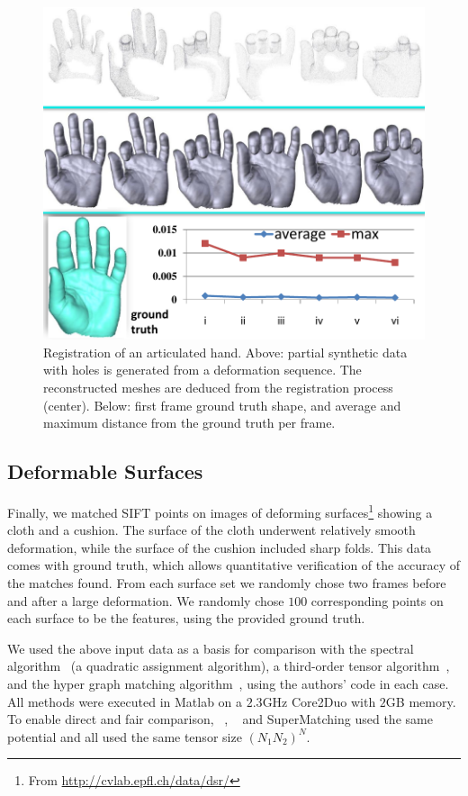 \begin{figure}[h]
\centering
  \includegraphics[width=0.95\linewidth]{figures/3DHand.pdf}
  \caption{Registration of an articulated hand.
  Above: partial synthetic data with holes is generated from a deformation sequence.
  The reconstructed meshes are deduced from the registration process (center).
  Below: first frame ground truth shape, and average and maximum distance from the ground truth per frame.}
\label{fig:3DHand}
\end{figure}

\subsection{Deformable Surfaces}
\label{subsec:2DDeformable}

Finally, we matched SIFT points on images of deforming surfaces\footnote{From \url{http://cvlab.epfl.ch/data/dsr/}} showing a cloth and a cushion.
The surface of the cloth underwent relatively smooth deformation, while the surface of the cushion included sharp folds.
This data comes with ground truth, which allows quantitative verification of the accuracy of the matches found.
From each surface set we randomly chose two frames before and after a large deformation.
We randomly chose $100$ corresponding points on each surface to be the features, using the provided ground truth.

We used the above input data as a basis for comparison with the spectral algorithm~\cite{Cour06} (a quadratic assignment algorithm),
a third-order tensor algorithm~\cite{Duchenne09},
and the hyper graph matching algorithm~\cite{Zass08}, using the authors' code in each case.
All methods were executed in Matlab on a $2.3$GHz Core2Duo with $2$GB memory.
To enable direct and fair comparison,
~\cite{Duchenne09}, ~\cite{Zass08} and SuperMatching
used the same potential and all used the same tensor size $(N_1N_2)^N$.

